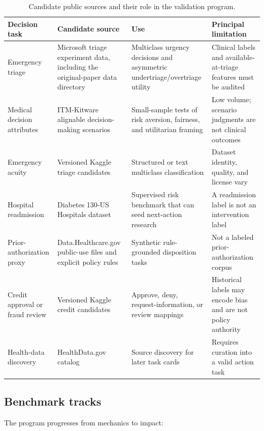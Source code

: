 \documentclass[conference]{IEEEtran}
\begin{document}
\begin{table}[t]
\centering
\caption{Candidate public sources and their role in the validation program.}
\label{tab:datasets}
\renewcommand{\arraystretch}{1.17}
\begin{tabular}{@{}p{3.0cm}p{4.1cm}p{5.0cm}p{3.5cm}@{}}
\toprule
\textbf{Decision task} & \textbf{Candidate source} & \textbf{Use} & \textbf{Principal limitation} \\
\midrule
Emergency triage & Microsoft triage experiment data, including the original-paper data directory~\cite{llmtriagerepo2026} & Multiclass urgency decisions and asymmetric undertriage/overtriage utility & Clinical labels and available-at-triage features must be audited \\
Medical decision attributes & ITM-Kitware alignable decision-making scenarios~\cite{alignabledm2024} & Small-sample tests of risk aversion, fairness, and utilitarian framing & Low volume; scenario judgments are not clinical outcomes \\
Emergency acuity & Versioned Kaggle triage candidates~\cite{kagglecatalog2026} & Structured or text multiclass classification & Dataset identity, quality, and license vary \\
Hospital readmission & Diabetes 130-US Hospitals dataset~\cite{ucireadmission2014} & Supervised risk benchmark that can seed next-action research & A readmission label is not an intervention label \\
Prior-authorization proxy & Data.Healthcare.gov public-use files and explicit policy rules~\cite{healthcarepuf2026} & Synthetic rule-grounded disposition tasks & Not a labeled prior-authorization corpus \\
Credit approval or fraud review & Versioned Kaggle credit candidates~\cite{kagglecatalog2026} & Approve, deny, request-information, or review mappings & Historical labels may encode bias and are not policy authority \\
Health-data discovery & HealthData.gov catalog~\cite{healthdatagov2026} & Source discovery for later task cards & Requires curation into a valid action task \\
\bottomrule
\end{tabular}
\end{table}

\subsection{Benchmark tracks}

The program progresses from mechanics to impact:
\end{document}
